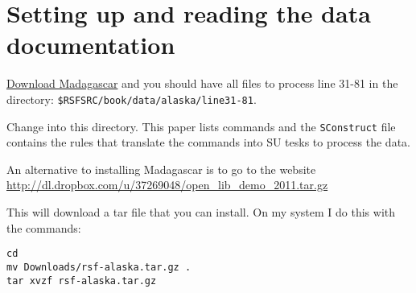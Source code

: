 \section{Setting up and reading the data documentation}
\href{http://www.ahay.org/wiki/Download}{Download Madagascar} and you
should have all files to process line 31-81 in 
the directory: \texttt{\$RSFSRC/book/data/alaska/line31-81}.

Change into this directory.  This paper lists commands and the \texttt{SConstruct} 
file contains the rules that translate the commands into SU tesks 
to process the data.

An alternative to installing Madagascar is to go to the website \url{http://dl.dropbox.com/u/37269048/open_lib_demo_2011.tar.gz}

This will download a tar file that you can install.  On my system I
do this with the commands:
\begin{verbatim}
cd
mv Downloads/rsf-alaska.tar.gz .
tar xvzf rsf-alaska.tar.gz
\end{verbatim}

\begin{comment}
This will untar the directory.  When it completes, continue:\\
cd open\_lib\_demo\_2011\\
cat readme

This will tell you about the files you downloaded.  You can look at the 
su commands the process will use by typing:\\
cat doit.job

Then you can run the processing by typing:\\  
./doit.job

You can also run the individual tasks with the scripts in the tar file. 
For example, to view the previous final stack, the text says run:
\begin{verbatim}
scons prevstack.view 
\end{verbatim}

You can run the script from the tar file:
\begin{verbatim}
./prevstack.job
\end{verbatim}

The scons will download the file \texttt{31\_81\_IM.JPG} from the Internet and 
display it using open office draw (oodraw).  The tar file supplies the 
files so the scripts skip the download.  ./prevstack.job just displays
the file using oodraw.
\end{comment}

